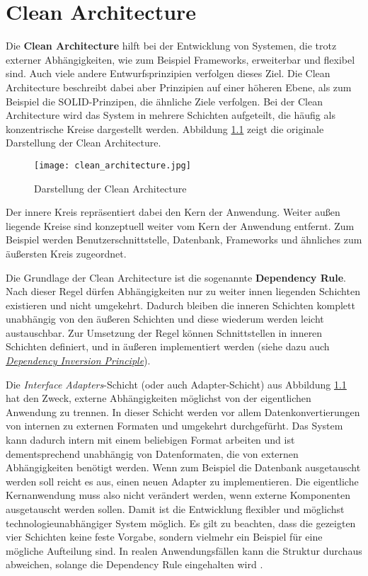 \chapter{Clean Architecture}
\label{ch:Clean_Architecture}

Die \textbf{Clean Architecture} hilft bei der Entwicklung von Systemen, die trotz externer Abhängigkeiten, wie zum Beispiel Frameworks, erweiterbar und flexibel sind.
Auch viele andere Entwurfsprinzipien verfolgen dieses Ziel.
Die Clean Architecture beschreibt dabei aber Prinzipien auf einer höheren Ebene, als zum Beispiel die SOLID-Prinzipen, die ähnliche Ziele verfolgen.
Bei der Clean Architecture wird das System in mehrere Schichten aufgeteilt, die häufig als konzentrische Kreise dargestellt werden.
Abbildung \ref{fig:clean_architecture_circles} zeigt die originale Darstellung der Clean Architecture.
\begin{figure}[h]
    \texttt{[image: clean\_architecture.jpg]}
    \centering
    \caption{Darstellung der Clean Architecture \cite{martin_clean_architecture}}
    \label{fig:clean_architecture_circles}
\end{figure}


Der innere Kreis repräsentiert dabei den Kern der Anwendung.
Weiter außen liegende Kreise sind konzeptuell weiter vom Kern der Anwendung entfernt.
Zum Beispiel werden Benutzerschnittstelle, Datenbank, Frameworks und ähnliches zum äußersten Kreis zugeordnet.

Die Grundlage der Clean Architecture ist die sogenannte \textbf{Dependency Rule}.
Nach dieser Regel dürfen Abhängigkeiten nur zu weiter innen liegenden Schichten existieren und nicht umgekehrt.
Dadurch bleiben die inneren Schichten komplett unabhängig von den äußeren Schichten und diese wiederum werden leicht austauschbar.
Zur Umsetzung der Regel können Schnittstellen in inneren Schichten definiert, und in äußeren implementiert werden (siehe dazu auch \textit{\hyperref[sec:DIP]{Dependency Inversion Principle}}).

Die \textit{Interface Adapters}-Schicht (oder auch Adapter-Schicht) aus Abbildung \ref{fig:clean_architecture_circles} hat den Zweck, externe Abhängigkeiten möglichst von der eigentlichen Anwendung zu trennen.
In dieser Schicht werden vor allem Datenkonvertierungen von internen zu externen Formaten und umgekehrt durchgefürht.
Das System kann dadurch intern mit einem beliebigen Format arbeiten und ist dementsprechend unabhängig von Datenformaten, die von externen Abhängigkeiten benötigt werden.
Wenn zum Beispiel die Datenbank ausgetauscht werden soll reicht es aus, einen neuen Adapter zu implementieren.
Die eigentliche Kernanwendung muss also nicht verändert werden, wenn externe Komponenten ausgetauscht werden sollen.
Damit ist die Entwicklung flexibler und möglichst technologieunabhängiger System möglich.
Es gilt zu beachten, dass die gezeigten vier Schichten keine feste Vorgabe, sondern vielmehr ein Beispiel für eine mögliche Aufteilung sind.
In realen Anwendungsfällen kann die Struktur durchaus abweichen, solange die Dependency Rule eingehalten wird \cite{martin_clean_architecture}.

